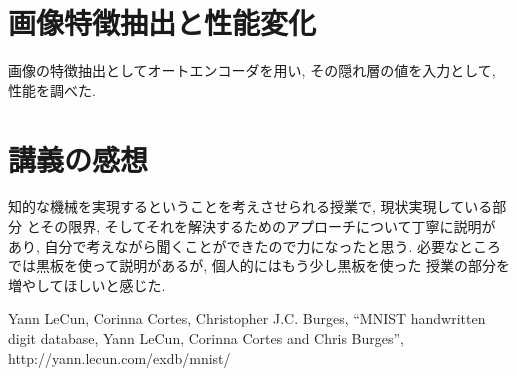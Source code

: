 \documentclass[10pt,a4paper,twocolumn]{jarticle}
\begin{document}
\section{画像特徴抽出と性能変化}
画像の特徴抽出としてオートエンコーダを用い, その隠れ層の値を入力として, 
性能を調べた. 
\section{講義の感想}
知的な機械を実現するということを考えさせられる授業で, 現状実現している部分
とその限界, そしてそれを解決するためのアプローチについて丁寧に説明が
あり, 自分で考えながら聞くことができたので力になったと思う. 
必要なところでは黒板を使って説明があるが, 個人的にはもう少し黒板を使った
授業の部分を増やしてほしいと感じた. 


\begin{thebibliography}{9}
   Yann LeCun, Corinna Cortes, Christopher J.C. Burges,
    ``MNIST handwritten digit database, Yann LeCun, Corinna Cortes and Chris Burges'',
    http://yann.lecun.com/exdb/mnist/
\end{thebibliography}

\end{document}
